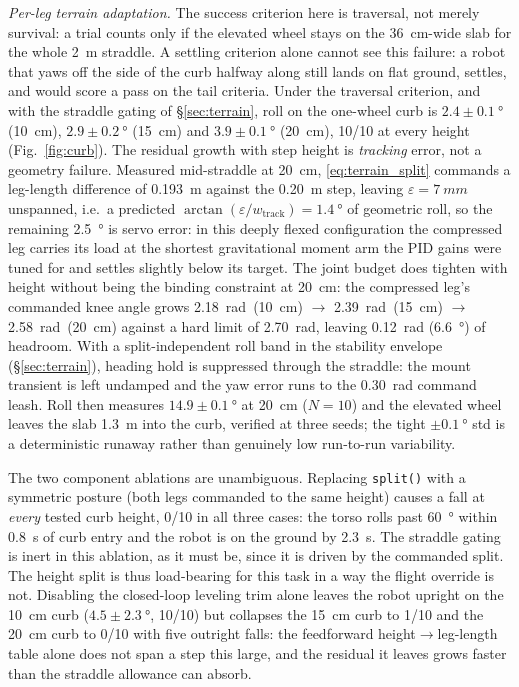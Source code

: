 \documentclass[conference]{IEEEtran}
\begin{document}
\emph{Per-leg terrain adaptation.}
The success criterion here is traversal, not merely survival: a trial counts
only if the elevated wheel stays on the \SI{36}{cm}-wide slab for the whole
\SI{2}{m} straddle. A settling criterion alone cannot see this failure: a robot that yaws off the side of the curb halfway along still lands on flat ground,
settles, and would score a pass on the tail criteria. Under the traversal
criterion, and with the straddle gating of \S\ref{sec:terrain}, roll on the
one-wheel curb is $2.4{\pm}\SI{0.1}{\degree}$ (\SI{10}{cm}),
$2.9{\pm}\SI{0.2}{\degree}$ (\SI{15}{cm}) and $3.9{\pm}\SI{0.1}{\degree}$
(\SI{20}{cm}), \num{10}/\num{10} at every height (Fig.~\ref{fig:curb}).
The residual growth with step height is \emph{tracking} error, not a geometry
failure. Measured mid-straddle at \SI{20}{cm}, \eqref{eq:terrain_split} commands
a leg-length difference of \SI{0.193}{m} against the \SI{0.20}{m} step, leaving
$\varepsilon{=}\SI{7}{mm}$ unspanned, i.e.\ a predicted
$\arctan(\varepsilon/w_{\text{track}}){=}\SI{1.4}{\degree}$ of geometric roll, so
the remaining \SI{2.5}{\degree} is
servo error: in this deeply flexed configuration the compressed leg carries its
load at the shortest gravitational moment arm the PID gains were tuned for and
settles slightly below its target. The joint budget does tighten with height
without being the binding constraint at \SI{20}{cm}: the compressed leg's
commanded knee angle grows \SI{2.18}{rad}~(\SI{10}{cm}) $\rightarrow$
\SI{2.39}{rad}~(\SI{15}{cm}) $\rightarrow$ \SI{2.58}{rad}~(\SI{20}{cm}) against
a hard limit of \SI{2.70}{rad}, leaving \SI{0.12}{rad} (\SI{6.6}{\degree}) of
headroom.
With a split-independent roll band in the stability envelope
(\S\ref{sec:terrain}), heading hold is suppressed through the straddle: the
mount transient is left undamped and the yaw error runs to the
\SI{0.30}{rad} command leash. Roll then measures $14.9{\pm}\SI{0.1}{\degree}$ at
\SI{20}{cm} ($N{=}10$) and the elevated wheel leaves the slab \SI{1.3}{m} into
the curb, verified at three seeds; the tight $\pm\SI{0.1}{\degree}$ std is a
deterministic runaway rather than genuinely low run-to-run variability.

The two component ablations are unambiguous. Replacing \texttt{split()} with a
symmetric posture (both legs commanded to the same height) causes a fall at \emph{every} tested curb height, \num{0}/\num{10} in
all three cases: the torso rolls past \SI{60}{\degree} within \SI{0.8}{s} of
curb entry and the robot is on the ground by \SI{2.3}{s}. The straddle gating is
inert in this ablation, as it must be, since it is driven by the commanded
split. The height split is thus load-bearing for this task in a way the flight
override is not. Disabling the closed-loop leveling trim alone leaves the robot
upright on the \SI{10}{cm} curb ($4.5{\pm}\SI{2.3}{\degree}$, \num{10}/\num{10})
but collapses the \SI{15}{cm} curb to \num{1}/\num{10} and the \SI{20}{cm} curb
to \num{0}/\num{10} with five outright falls: the feedforward height$\rightarrow$leg-length table alone does not span a step this large, and
the residual it leaves grows faster than the straddle allowance can absorb.
\end{document}
